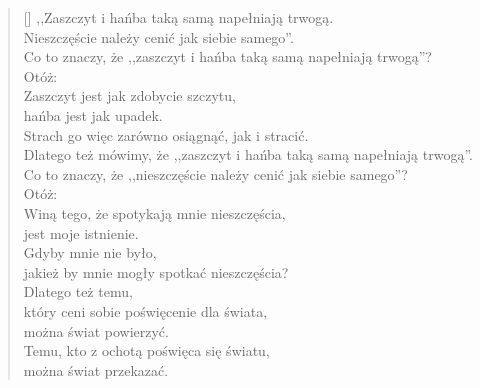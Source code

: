 \settowidth{\versewidth}{Co to znaczy, że ,,zaszczyt i hańba taką samą
  napełniają trwogą''?}
\begin{verse}[\versewidth]
  ,,Zaszczyt i hańba taką samą napełniają trwogą. \\
  Nieszczęście należy cenić jak siebie samego''. \\
  Co to znaczy, że ,,zaszczyt i hańba taką samą napełniają trwogą''? \\
  Otóż: \\
  Zaszczyt jest jak zdobycie szczytu, \\
  hańba jest jak upadek. \\
  Strach go więc zarówno osiągnąć, jak i stracić. \\
  Dlatego też mówimy, że ,,zaszczyt i hańba taką samą napełniają trwogą''. \\
  Co to znaczy, że ,,nieszczęście należy cenić jak siebie samego''? \\
  Otóż: \\
  Winą tego, że spotykają mnie nieszczęścia, \\
  jest moje istnienie. \\
  Gdyby mnie nie było, \\
  jakież by mnie mogły spotkać nieszczęścia? \\
  Dlatego też temu, \\
  który ceni sobie poświęcenie dla świata, \\
  można świat powierzyć. \\
  Temu, kto z ochotą poświęca się światu, \\
  można świat przekazać.
\end{verse}
% 
